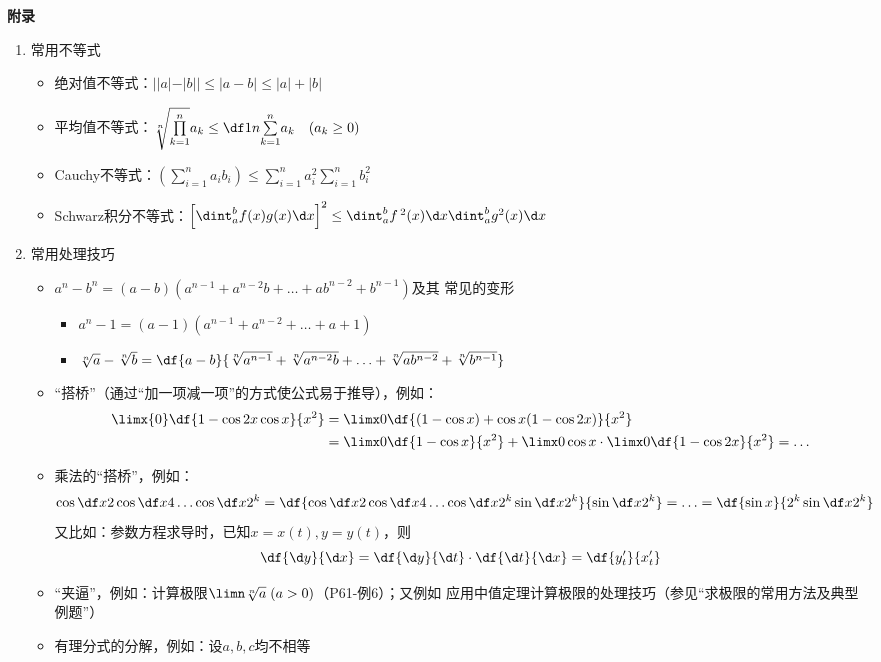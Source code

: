{\bf 附录}
\begin{enumerate}
  \item 常用不等式
  \begin{itemize}
    \item 绝对值不等式：$||a|-|b||\leq |a-b|\leq |a|+|b|$
    \item 平均值不等式：$\sqrt[n]{\prod\limits_{k=1}^n}a_k
    \leq\df 1n{\sum\limits_{k=1}^n}a_k
    \quad (a_k\geq 0)$
	\item Cauchy不等式：$\left(\sum\limits_{i=1}^na_ib_i\right)\leq
	\sum\limits_{i=1}^na_i^2\sum\limits_{i=1}^nb_i^2$
	\item Schwarz积分不等式：$\left[\dint_a^bf(x)g(x)\d x\right]^2
	\leq\dint_a^bf\,^2(x)\d x\dint_a^bg^2(x)\d x$ 
  \end{itemize}
  \item 常用处理技巧
  \begin{itemize}
    \item $a^n-b^n=(a-b)(a^{n-1}+a^{n-2}b+\ldots+ab^{n-2}+b^{n-1})$及其
    常见的变形
    \begin{itemize}
      \item $a^n-1=(a-1)(a^{n-1}+a^{n-2}+\ldots+a+1)$
      \item $\sqrt[n]a-\sqrt[n]b=\df{a-b}{\sqrt[n]{a^{n-1}}
      +\sqrt[n]{a^{n-2}b}+\ldots+\sqrt[n]{ab^{n-2}}+\sqrt[n]{b^{n-1}}}$
	\end{itemize}
	\item “搭桥”（通过“加一项减一项”的方式使公式易于推导），例如：
      \begin{align}
      	\limx{0}\df{1-\cos2x\cos x}{x^2}&=\limx0\df{(1-\cos x)+
      	\cos x(1-\cos2x)}{x^2}\notag\\
      	&=\limx0\df{1-\cos x}{x^2}+\limx0\cos x
      \cdot\limx0\df{1-\cos2x}{x^2}=\ldots\notag
      \end{align}
    \item 乘法的“搭桥”，例如：
    $$\cos\df x2\cos\df x{4}\ldots\cos\df x{2^k}
    =\df{\cos\df x2\cos\df x{4}\ldots\cos\df x{2^k}\sin\df x{2^k}}
    {\sin\df x{2^k}}=\ldots=\df{\sin x}{2^k\sin\df x{2^k}}$$
    又比如：参数方程求导时，已知$x=x(t),y=y(t)$，则
    $$\df{\d y}{\d x}=\df{\d y}{\d t}\cdot\df{\d t}{\d x}=\df{y'_t}{x'_t}$$
    \item “夹逼”，例如：计算极限$\limn\sqrt[n]a\;(a>0)$（P61-例6）；又例如
    应用中值定理计算极限的处理技巧（参见“求极限的常用方法及典型例题”）
    \item 有理分式的分解，例如：设$a,b,c$均不相等

\end{itemize}
\end{enumerate}

